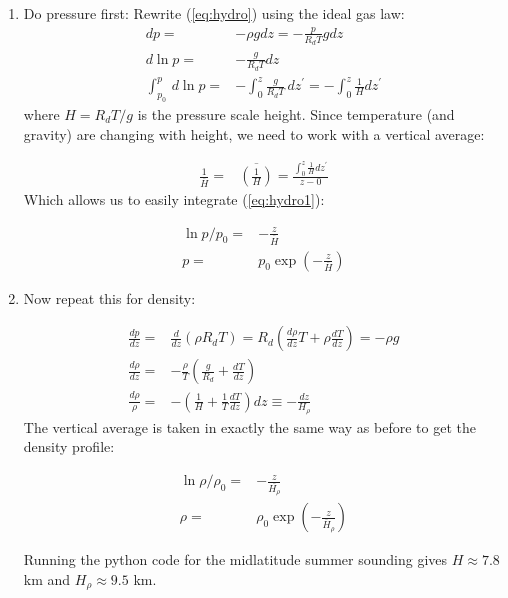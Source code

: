 \documentclass[12pt]{article}
\begin{document}
\begin{enumerate}
\item Do pressure first: Rewrite (\ref{eq:hydro}) using the ideal gas law:
  \begin{align}
  dp =& - \rho g dz = - \frac{p}{R_d T}  g dz\\
  d\ln p =& - \frac{g }{R_d T} dz\\
  \int_{p_0}^{p}\!\,d \ln p =& - \int_{0 }^{z}\!\frac{g }{R_d T} \,dz^\prime = - \int_{0 }^{z}\!\frac{1}{H} dz^\prime \label{eq:hydro1}
  \end{align}
where $H=R_d T/g$ is the pressure scale height.  Since temperature (and gravity) are changing with height,
we need to work with a vertical average:

\begin{align}
\frac{ 1}{\overline{H}} =&  \overline{ \left ( \frac{1 }{H} \right )} = \frac{\int_{0 }^{z}\!\frac{1}{H} dz^\prime  }{z-0} 
\end{align}
Which allows us to easily integrate (\ref{eq:hydro1}):

\begin{align}
  \ln p/p_0 =& - \frac{z }{\overline{H }} \\
  p =& p_0 \exp \left ( - \frac{z }{\overline H} \right )
\end{align}


\item Now repeat this for density:

  \begin{align}
 \frac{dp }{dz}  =& \frac{d }{dz}  (\rho R_d T) = R_d \left ( \frac{d\rho }{dz} T 
              + \rho \frac{ dT}{dz} \right )  = - \rho g \\
\frac{d\rho }{dz}  =& -\frac{\rho }{T}  \left ( \frac{g }{R_d} + \frac{ dT}{dz} \right )\\
\frac{d\rho }{\rho} =& - \left ( \frac{1 }{H} + 
                   \frac{1 }{T} \frac{dT }{dz} \right ) dz \equiv - \frac{dz }{H_\rho} 
  \end{align}
The vertical average is taken in exactly the same way as before to get the density profile:

\begin{align}
  \ln \rho/\rho_0 =& - \frac{z }{\overline{H_\rho }} \\
  \rho =& \rho_0 \exp \left ( - \frac{z }{\overline H_\rho} \right )
\end{align}

Running the python code for the midlatitude summer sounding gives
$H\approx7.8$ km and $H_\rho \approx 9.5$ km.


\end{enumerate}
\end{document}
